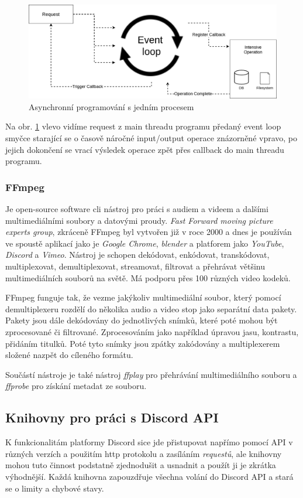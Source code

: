 \documentclass[
  program=inf,
biblatex=false,
sourcecodes=true,
joinlists=true,
  figures=true,
  tables=true,
  glossaries=true,
  index=false
]{kidiplom}
\begin{document}
\begin{figure}[h]
  \centering \includegraphics[scale=0.38]{loop}
  \caption{\label{asyncio}Asynchronní programování s jedním procesem \cite{loop}}
\end{figure}

Na obr. \ref{asyncio} vlevo vidíme request z main threadu programu předaný event loop
smyčce starající se o časově náročné input/output operace znázorněné vpravo, po jejich dokončení
se vrací výsledek operace zpět přes callback do main threadu programu.

\subsubsection{FFmpeg}
Je open-source software \acrshort{cli} nástroj pro práci s audiem a videem a dalšími multimediálními
soubory a datovými proudy. \cite{ffmpeg} \cite{ffmpeg2} {\it Fast Forward moving picture experts group}, zkráceně FFmpeg
byl vytvořen již v roce 2000 a dnes je používán ve spoustě aplikací jako je {\it Google Chrome}, 
{\it blender} a platforem jako {\it YouTube}, {\it Discord} a {\it Vimeo}. Nástroj je schopen
dekódovat, enkódovat, transkódovat, multiplexovat, demultiplexovat, streamovat, filtrovat a přehrávat
většinu multimediálních souborů na světě. Má podporu přes 100 různých video kodeků.

FFmpeg funguje tak, že vezme jakýkoliv multimediální soubor, který pomocí demultiplexeru rozdělí
do několika audio a video stop jako separátní data pakety. Pakety jsou dále dekódovány do jednotlivých
snímků, které poté mohou být zprocesované či filtrované. Zprocesováním jako například úpravou jasu, kontrastu,
přidáním titulků. Poté tyto snímky jsou zpátky zakódovány a multiplexerem složené nazpět do cíleného formátu.

Součástí nástroje je také nástroj {\it ffplay} pro přehrávání multimediálního souboru a {\it ffprobe} pro
získání metadat ze souboru.

\subsection{Knihovny pro práci s Discord API}
K funkcionalitám platformy Discord sice jde přistupovat napřímo pomocí API v různých verzích a
použitím \acrshort{http} protokolu a zasíláním {\it requestů}, ale knihovny mohou tuto činnost
podstatně zjednodušit a usnadnit a použít ji je zkrátka výhodnější. Každá knihovna zapouzdřuje všechna volání 
do Discord API a stará se o limity a chybové stavy. 
\end{document}
